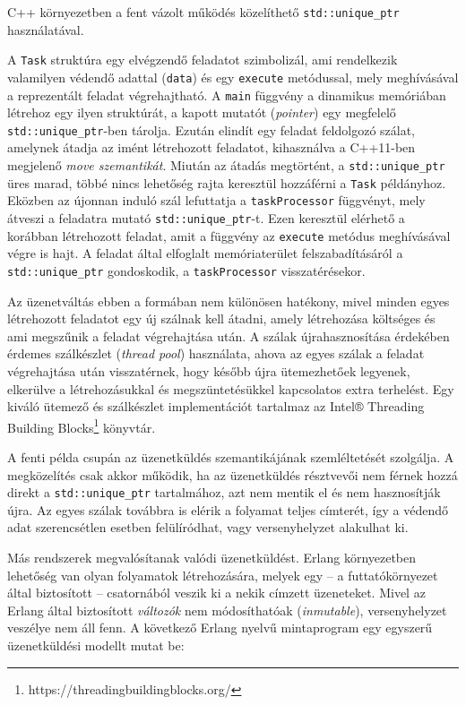     C++ környezetben a fent vázolt működés közelíthető \texttt{std::unique\_ptr} használatával.
    
%
    A \texttt{Task} struktúra egy elvégzendő feladatot szimbolizál, ami rendelkezik valamilyen védendő adattal (\texttt{data}) és egy \texttt{execute} metódussal, mely meghívásával a reprezentált feladat végrehajtható. A \texttt{main} függvény a dinamikus memóriában létrehoz egy ilyen struktúrát, a kapott mutatót (\emph{pointer}) egy megfelelő \texttt{std::unique\_ptr}-ben tárolja. Ezután elindít egy feladat feldolgozó szálat, amelynek átadja az imént létrehozott feladatot, kihasználva a C++11-ben megjelenő \emph{move szemantikát}. Miután az átadás megtörtént, a \texttt{std::unique\_ptr} üres marad, többé nincs lehetőség rajta keresztül hozzáférni a \texttt{Task} példányhoz. Eközben az újonnan induló szál lefuttatja a \texttt{taskProcessor} függvényt, mely átveszi a feladatra mutató \texttt{std::unique\_ptr}-t. Ezen keresztül elérhető a korábban létrehozott feladat, amit a függvény az \texttt{execute} metódus meghívásával végre is hajt. A feladat által elfoglalt memóriaterület felszabadításáról a \texttt{std::unique\_ptr} gondoskodik, a \texttt{taskProcessor} visszatérésekor.
    
    Az üzenetváltás ebben a formában nem különösen hatékony, mivel minden egyes létrehozott feladatot egy új szálnak kell átadni, amely létrehozása költséges és ami megszűnik a feladat végrehajtása után. A szálak újrahasznosítása érdekében érdemes szálkészlet (\emph{thread pool}) használata, ahova az egyes szálak a feladat végrehajtása után visszatérnek, hogy később újra ütemezhetőek legyenek, elkerülve a létrehozásukkal és megszüntetésükkel kapcsolatos extra terhelést. Egy kiváló ütemező és szálkészlet implementációt tartalmaz az Intel® Threading Building Blocks\footnote{https://threadingbuildingblocks.org/} könyvtár.
    
    A fenti példa csupán az üzenetküldés szemantikájának szemléltetését szolgálja. A megközelítés csak akkor működik, ha az üzenetküldés résztvevői nem férnek hozzá direkt a \texttt{std::unique\_ptr} tartalmához, azt nem mentik el és nem hasznosítják újra. Az egyes szálak továbbra is elérik a folyamat teljes címterét, így a védendő adat szerencsétlen esetben felülíródhat, vagy versenyhelyzet alakulhat ki.
    
    Más rendszerek megvalósítanak valódi üzenetküldést. Erlang környezetben lehetőség van olyan folyamatok létrehozására, melyek egy -- a futtatókörnyezet által biztosított -- csatornából veszik ki a nekik címzett üzeneteket. Mivel az Erlang által biztosított \emph{változók} nem módosíthatóak (\emph{inmutable}), versenyhelyzet veszélye nem áll fenn. A következő Erlang nyelvű mintaprogram egy egyszerű üzenetküldési modellt mutat be:
    
